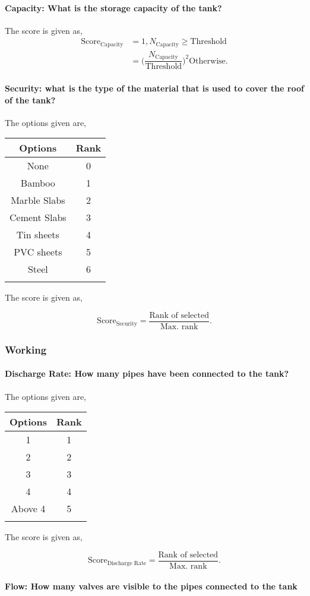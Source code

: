 \documentclass[oneside,twocolumn]{article}
\newcommand{\tsub}[2]{\text{#1}_{\text{#2}}}
\newcommand{\tsubb}[2]{#1_{\text{#2}}}
\newcommand{\dsub}[2]{\dfrac{\text{#1}}{\text{#2}}}
\newcommand{\singsel}[1]
{
	\[
		\tsub{Score}{#1} = \dsub{Rank of selected}{Max. rank}.
	\]
}
\newenvironment{ttable}
{
\begin{center}
\begin{tabular}{c|c}
\hline
}
{
\\ \hline
\end{tabular}
\end{center}
}
\begin{document}
\paragraph{Capacity: 
What is the storage capacity of the tank? 
}

The score is given as,
\begin{align*}
\tsub{Score}{Capacity} &= 1, \tsubb{N}{Capacity} \ge \text{Threshold} \\
        &=
\Big(\dfrac{\tsubb{N}{Capacity}}{\text{Threshold}}\Big)^{2}
\text{Otherwise}.
\end{align*}
\paragraph{Security: 
what is the type of the material that is used to cover the roof of the tank? 
}

The options given are,
\begin{ttable}
Options & Rank \\ \hline
None & 0 \\
Bamboo & 1 \\
Marble Slabs & 2 \\
Cement Slabs & 3 \\
Tin sheets & 4 \\
PVC sheets  & 5 \\
Steel & 6 \\
\hline
\end{ttable}
The score is given as,
\singsel{Security}
\subsubsection{Working}

\paragraph{Discharge Rate: How many pipes have been connected to the tank?}

The options given are,
\begin{ttable}
Options & Rank \\ \hline
1 & 1 \\
2 & 2 \\
3 & 3 \\
4 & 4 \\
Above 4 & 5 \\
\hline
\end{ttable}
The score is given as,
\singsel{Discharge Rate}
\paragraph{Flow: 
How many valves are visible to the pipes connected to the tank 
}
\end{document}

